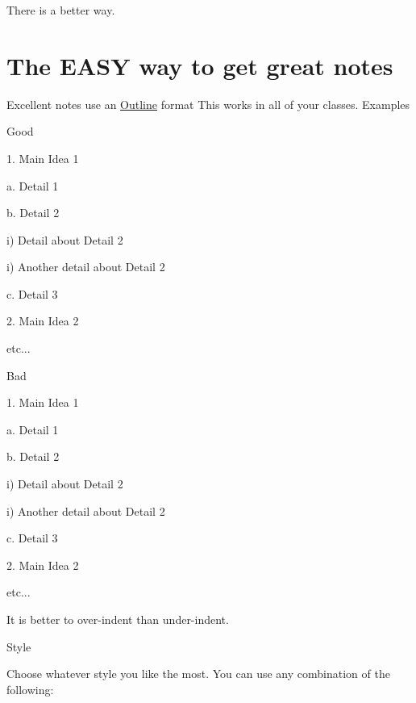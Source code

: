 \documentclass[../main.tex]{subfiles}
\begin{document}
There is a better way.

\section{The EASY way to get great notes}

\begin{outline}[enumerate]

\1 Excellent notes use an \underline{Outline} format
	\2	
	\2 This works in all of your classes.
\1 Examples
	\begin{boxgreen}{Good}

	1. Main Idea 1

	\quad a. Detail 1

	\quad b. Detail 2


	\quad \quad i) Detail about Detail 2

	\quad \quad i) Another detail about Detail 2

	\quad c. Detail 3

	2. Main Idea 2

	\quad \quad etc...
	\end{boxgreen}

	\begin{boxred}{Bad}

	1. Main Idea 1

	a. Detail 1

	b. Detail 2

	i) Detail about Detail 2

	i) Another detail about Detail 2

	c. Detail 3

	2. Main Idea 2

	\quad \quad etc...

	\end{boxred}


	\1 It is better to over-indent than under-indent.

	\1 Style

		\2 Choose whatever style you like the most.  You can use any combination of the following:

	\begin{displayquote}


\end{displayquote}
\end{outline}
\end{document}
